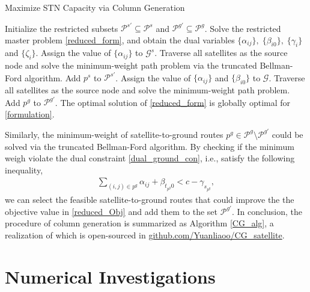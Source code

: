 \documentclass[journal,10pt]{IEEEtran}
\begin{document}
\begin{algorithm}[!t]
\caption{Maximize STN Capacity via Column Generation}
\label{CG_alg}
\begin{algorithmic}[1]
\STATE Initialize the restricted subsets $\mathcal{P}^{s'} \subseteq \mathcal{P}^s$ and $\mathcal{P}^{g'} \subseteq \mathcal{P}^g$. \label{CG_line1}
\REPEAT
\STATE Solve the restricted master problem \eqref{reduced_form}, and obtain the dual variables $\{\alpha_{ij}\}, \; \{\beta_{i0}\}, \; \{\gamma_i\}$ and $ \{\zeta_i\}$. 
\STATE Assign the value of $\{\alpha_{ij}\}$ to $\mathcal{G}^s$. Traverse all satellites as the source node and solve the minimum-weight path problem via the truncated Bellman-Ford algorithm.
\STATE Add $p^s$ to $\mathcal{P}^{s'}$.
\ENDIF
\STATE Assign the value of $\{\alpha_{ij}\}$ and $\{\beta_{i0}\}$ to $\mathcal{G}$. Traverse all satellites as the source node and solve the minimum-weight path problem.
\STATE Add $p^g$ to $\mathcal{P}^{g'}$.
\ENDIF
{}
\STATE The optimal solution of \eqref{reduced_form} is globally optimal for \eqref{formulation}.
\end{algorithmic}
\end{algorithm}

Similarly, the minimum-weight of satellite-to-ground routes $p^g \in \mathcal{P}^{g} \!\! \setminus \!\! \mathcal{P}^{g'}$ could be solved via the truncated Bellman-Ford algorithm. By checking if the minimum weigh violate the dual constraint \eqref{dual_ground_con}, i.e., satisfy the following inequality,
\begin{align}
\label{ground_route_ineq}
\sum_{(i,j) \in p^g} \!\!\!\!\! \alpha_{ij} + \beta_{t_{p^g}0} <  c - \gamma_{s_{p^g}},
\end{align}
we can select the feasible satellite-to-ground routes that could improve the the objective value in \eqref{reduced_Obj} and add them to the set $\mathcal{P}^{g'}$. In conclusion, the procedure of column generation is summarized as Algorithm \ref{CG_alg}, a realization of which is open-sourced in \href{https://github.com/Yuanliaoo/CG_satellite}{github.com/Yuanliaoo/CG\_satellite}.

\section{Numerical Investigations}
\label{NumericalResults}
\end{document}
